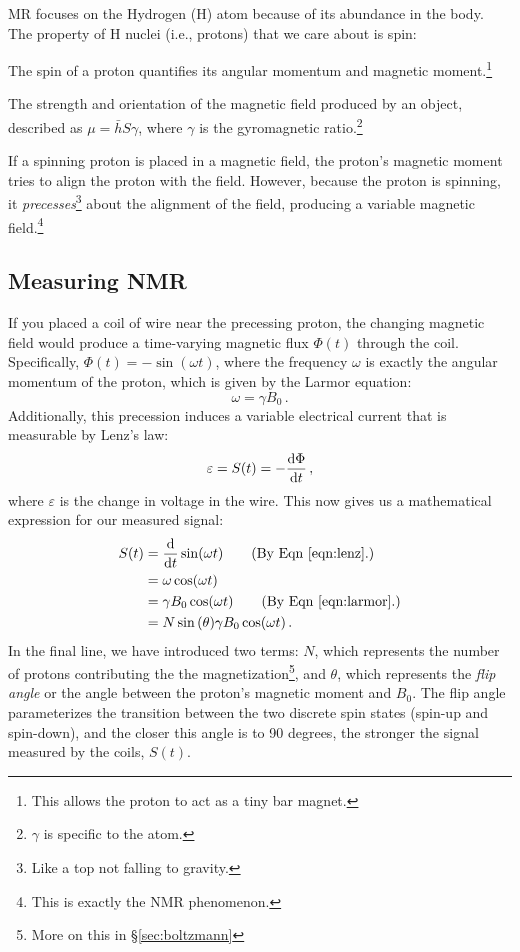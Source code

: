 MR focuses on the Hydrogen (H) atom because of its abundance in the body.
The property of H nuclei (i.e., protons) that we care about is spin:
\begin{defn}[Spin]
The spin of a proton quantifies its angular momentum and magnetic moment.\footnote{This allows the proton to act as a tiny bar magnet.}
\end{defn}
\begin{defn}
The strength and orientation of the magnetic field produced by an object, described as $\mu = \bar h S \gamma$, where $\gamma$ is the gyromagnetic ratio.\footnote{$\gamma$ is specific to the atom.}
\end{defn}
If a spinning proton is placed in a magnetic field, the proton's magnetic moment tries to align the proton with the field. However, because the proton is spinning, it \textit{precesses}\footnote{Like a top not falling to gravity.} about the alignment of the field, producing a variable magnetic field.\footnote{This is exactly the NMR phenomenon.}

\subsection{Measuring NMR}

If you placed a coil of wire near the precessing proton, the changing magnetic field would produce a time-varying magnetic flux $\Phi(t)$ through the coil.
Specifically, $\Phi(t) = -\sin(\omega t)$, where the frequency $\omega$ is exactly the angular momentum of the proton, which is given by the Larmor equation:
\begin{equation}
    \label{eqn:larmor}
    \omega = \gamma B_0\,.
\end{equation}
Additionally, this precession induces a variable electrical current that is measurable by Lenz's law:
\begin{equation}
    \label{eqn:lenz}
    \varepsilon = S(t) = -\frac{\mathrm d \Phi}{\mathrm d t} \,,
\end{equation}
where $\varepsilon$ is the change in voltage in the wire.
This now gives us a mathematical expression for our measured signal:
\begin{align}
    S(t)
    &= \frac{\d}{\d t} \sin(\omega t) \tag{By Eqn \ref{eqn:lenz}.} \\
    &= \omega \cos(\omega t) \tag*{} \\
    &= \gamma B_0\cos(\omega t) \tag{By Eqn \ref{eqn:larmor}.} \\
    &= N \sin{(\theta)} \gamma B_0\cos(\omega t) \,. \label{eqn:precess}
\end{align}
In the final line, we have introduced two terms:
$N$, which represents the number of protons contributing the the magnetization\footnote{More on this in \S\ref{sec:boltzmann} }, and $\theta$, which represents the \textit{flip angle} or the angle between the proton's magnetic moment and $B_0$.
The flip angle parameterizes the transition between the two discrete spin states (spin-up and spin-down), and the closer this angle is to 90 degrees, the stronger the signal measured by the coils, $S(t)$.

